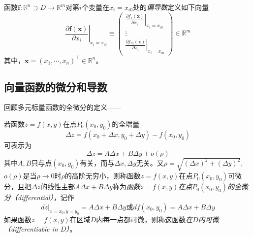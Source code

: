 \documentclass[main.tex]{subfiles}
\begin{document}
\begin{definition}[向量函数的偏导数]\label{def:II.4.11}
    函数$\mathbf{f}:\mathbb{R}^n\supset D\rightarrow\mathbb{R}^m$对第$i$个变量在$x_i=x_{i0}$处的\emph{偏导数}定义如下向量
    \[
        \left.\frac{\partial \mathbf{f}\left(\mathbf{x}\right)}{\partial x_i}\right|_{x_i=x_{i0}}\equiv\left(\begin{array}{c}
                \left.\frac{\partial f_1\left(\mathbf{x}\right)}{\partial x_i}\right|_{x_i=x_{i0}} \\
                \vdots                                                                             \\
                \left.\frac{\partial f_m\left(\mathbf{x}\right)}{\partial x_i}\right|_{x_i=x_{i0}}\end{array}\right)\in\mathbb{R}^m
    \]
    其中，$\mathbf{x}=\left(x_1,\cdots,x_n\right)^\intercal\in\mathbb{R}^n$。
\end{definition}


\subsection{向量函数的微分和导数}
回顾多元标量函数的全微分的定义\cite[“定义7.3.1”,p.~19]{华工高数2009下}——

\begin{definition}[多元标量值函数的微分]\label{def:II.4.12}
    若函数$z=f\left(x,y\right)$在点$P_0\left(x_0,y_0\right)$的全增量
    \[
        \Delta z=f\left(x_0+\Delta x,y_0+\Delta y\right)-f\left(x_0,y_0\right)
    \]
    可表示为
    \[
        \Delta z=A \Delta x+ B \Delta y+o\left(\rho\right)
    \]
    其中$A,B$只与点$\left(x_0,y_0\right)$有关，而与$\Delta x,\Delta y$无关。又$\rho=\sqrt{\left(\Delta x\right)^2+\left(\Delta y\right)^2}$,$o\left(\rho\right)$是当$\rho\rightarrow 0$时$\rho$的高阶无穷小，则称函数$z=f\left(x,y\right)$在点$P_0\left(x_0,y_0\right)$可微分，且把$\Delta z$的线性主部$A\Delta x+B\Delta y$称为\emph{函数$z=f\left(x,y\right)$在点$P_0\left(x_0,y_0\right)$的全微分（differential）}，记作
    \[
        \left.dz\right|_{x=x_0,y=y_0}=A\Delta x+B\Delta y\text{或}df\left(x_0,y_0\right)=A\Delta x+B\Delta y
    \]
    如果函数$z=f\left(x,y\right)$在区域$D$内每一点都可微，则称这函数\emph{在$D$内可微（differentiable in $D$）}。
\end{definition}
\end{document}
